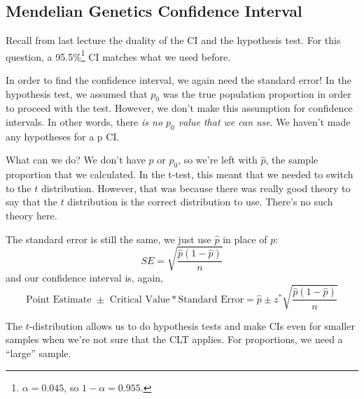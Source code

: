 \documentclass[
  letterpaper,
  DIV=11,
  numbers=noendperiod,
  oneside]{scrreprt}
\begin{document}
\hypertarget{mendelian-genetics-confidence-interval}{%
\subsection{Mendelian Genetics Confidence
Interval}\label{mendelian-genetics-confidence-interval}}

Recall from last lecture the duality of the CI and the hypothesis test.
For this question, a 95.5\%\footnote{\(\alpha = 0.045\), so
  \(1 - \alpha = 0.955\).} CI matches what we used before.

In order to find the confidence interval, we again need the standard
error! In the hypothesis test, we assumed that \(p_0\) was the true
population proportion in order to proceed with the test. However, we
don't make this assumption for confidence intervals. In other words,
there \emph{is no \(p_0\) value that we can use}. We haven't made any
hypotheses for a p CI.

What can we do? We don't have \(p\) or \(p_0\), so we're left with
\(\hat p\), the sample proportion that we calculated. In the t-test,
this meant that we needed to switch to the \(t\) distribution. However,
that was because there was really good theory to say that the \(t\)
distribution is the correct distribution to use. There's no such theory
here.

The standard error is still the same, we just use \(\hat p\) in place of
\(p\): \[
SE = \sqrt{\dfrac{\hat p(1 - \hat p)}{n}}
\] and our confidence interval is, again, \[
\text{Point Estimate }\pm\text{ Critical Value} * \text{Standard Error} = \hat p \pm z^*\sqrt{\dfrac{\hat p(1 - \hat p)}{n}}
\]

\begin{tcolorbox}[enhanced jigsaw, toprule=.15mm, colbacktitle=quarto-callout-warning-color!10!white, title=\textcolor{quarto-callout-warning-color}{\faExclamationTriangle}\hspace{0.5em}{CIs for Proportions Only Work When the CLT Applies}, arc=.35mm, colframe=quarto-callout-warning-color-frame, colback=white, titlerule=0mm, left=2mm, bottomtitle=1mm, bottomrule=.15mm, breakable, opacitybacktitle=0.6, leftrule=.75mm, toptitle=1mm, coltitle=black, rightrule=.15mm, opacityback=0]

The \(t\)-distribution allows us to do hypothesis tests and make CIs
even for smaller samples when we're not sure that the CLT applies. For
proportions, we need a ``large'' sample.

\end{tcolorbox}
\end{document}
